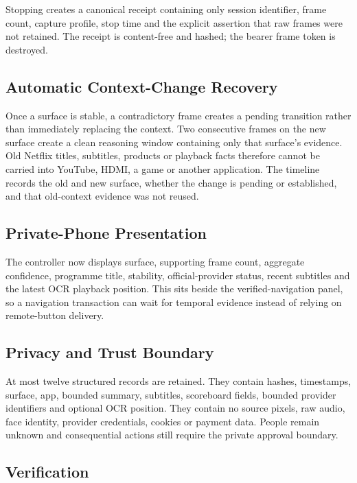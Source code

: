 Stopping creates a canonical receipt containing only session identifier, frame
count, capture profile, stop time and the explicit assertion that raw frames were
not retained. The receipt is content-free and hashed; the bearer frame token is
destroyed.

\subsection{Automatic Context-Change Recovery}

Once a surface is stable, a contradictory frame creates a pending transition
rather than immediately replacing the context. Two consecutive frames on the
new surface create a clean reasoning window containing only that surface's
evidence. Old Netflix titles, subtitles, products or playback facts therefore
cannot be carried into YouTube, HDMI, a game or another application. The
timeline records the old and new surface, whether the change is pending or
established, and that old-context evidence was not reused.

\subsection{Private-Phone Presentation}

The controller now displays surface, supporting frame count, aggregate confidence,
programme title, stability, official-provider status, recent subtitles and the
latest OCR playback position.  This sits beside the verified-navigation panel,
so a navigation transaction can wait for temporal evidence instead of relying
on remote-button delivery.

\subsection{Privacy and Trust Boundary}

At most twelve structured records are retained.  They contain hashes, timestamps,
surface, app, bounded summary, subtitles, scoreboard fields, bounded provider
identifiers and optional OCR position.  They contain no source pixels, raw audio,
face identity, provider credentials, cookies or payment data.  People remain
unknown and consequential actions still require the private approval boundary.

\subsection{Verification}

